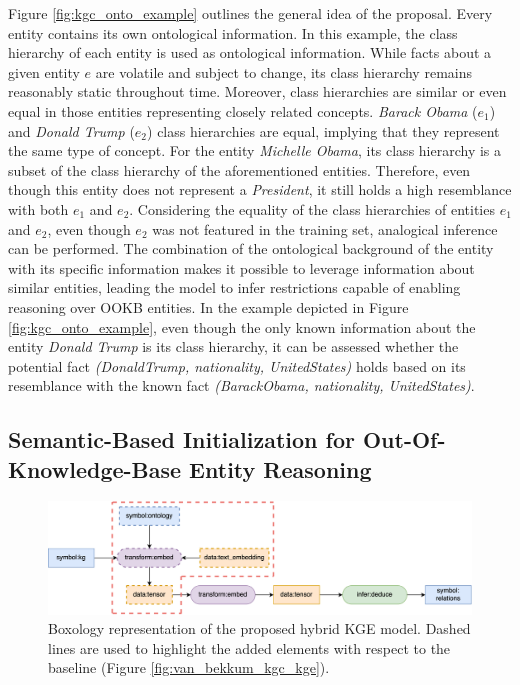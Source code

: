 Figure \ref{fig:kgc_onto_example} outlines the general idea of the proposal. Every entity contains its own ontological information. In this example, the class hierarchy of each entity is used as ontological information. While facts about a given entity $e$ are volatile and subject to change, its class hierarchy remains reasonably static throughout time. Moreover, class hierarchies are similar or even equal in those entities representing closely related concepts. \textit{Barack Obama} ($e_1$) and \textit{Donald Trump} ($e_2$) class hierarchies are equal, implying that they represent the same type of concept. For the entity \textit{Michelle Obama}, its class hierarchy is a subset of the class hierarchy of the aforementioned entities. Therefore, even though this entity does not represent a \textit{President}, it still holds a high resemblance with both $e_1$ and $e_2$. Considering the equality of the class hierarchies of entities $e_1$ and $e_2$, even though $e_2$ was not featured in the training set, analogical inference can be performed. The combination of the ontological background of the entity with its specific information makes it possible to leverage information about similar entities, leading the model to infer restrictions capable of enabling reasoning over OOKB entities. In the example depicted in Figure \ref{fig:kgc_onto_example}, even though the only known information about the entity \textit{Donald Trump} is its class hierarchy, it can be assessed whether the potential fact \textit{(DonaldTrump, nationality, UnitedStates)} holds based on its resemblance with the known fact \textit{(BarackObama, nationality, UnitedStates)}. 


\subsection{Semantic-Based Initialization for Out-Of-Knowledge-Base Entity Reasoning}

\label{4_sec:semantic_initialization}
\begin{figure}
    \centering
    \includegraphics[width=\linewidth]{4_kbsintegrationdl/figures/VanBekkum_KGEOnto.eps}
    \caption{Boxology representation of the proposed hybrid KGE model. Dashed lines are used to highlight the added elements with respect to the baseline (Figure \ref{fig:van_bekkum_kgc_kge}).}
    \label{fig:box_krintodl}
\end{figure} 

